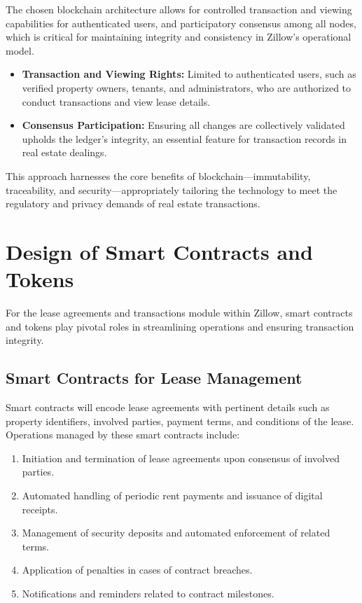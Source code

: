 \documentclass{article}
\begin{document}
The chosen blockchain architecture allows for controlled transaction and viewing capabilities for authenticated users, and participatory consensus among all nodes, which is critical for maintaining integrity and consistency in Zillow's operational model.

\begin{itemize}
    \item \textbf{Transaction and Viewing Rights:} Limited to authenticated users, such as verified property owners, tenants, and administrators, who are authorized to conduct transactions and view lease details.
    
    \item \textbf{Consensus Participation:} Ensuring all changes are collectively validated upholds the ledger's integrity, an essential feature for transaction records in real estate dealings.
\end{itemize}

This approach harnesses the core benefits of blockchain—immutability, traceability, and security—appropriately tailoring the technology to meet the regulatory and privacy demands of real estate transactions.

\section{Design of Smart Contracts and Tokens}

For the lease agreements and transactions module within Zillow, smart contracts and tokens play pivotal roles in streamlining operations and ensuring transaction integrity.

\subsection{Smart Contracts for Lease Management}
Smart contracts will encode lease agreements with pertinent details such as property identifiers, involved parties, payment terms, and conditions of the lease. Operations managed by these smart contracts include:
\begin{enumerate}
  \item Initiation and termination of lease agreements upon consensus of involved parties.
  \item Automated handling of periodic rent payments and issuance of digital receipts.
  \item Management of security deposits and automated enforcement of related terms.
  \item Application of penalties in cases of contract breaches.
  \item Notifications and reminders related to contract milestones.
\end{enumerate}
\end{document}
